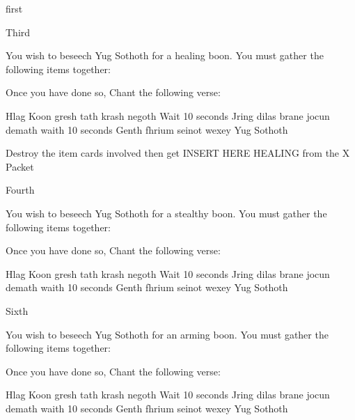 \documentclass[greennotebook]{guildcamp4} %
\begin{document}
\startnotebook{\nRasputinYog{}}

\begin{page}{first}
\end{page}

\begin{page}{Third}
		
		You wish to beseech Yug Sothoth for a healing boon. You must gather the following items together: 
		
		Once you have done so, Chant the following verse:
		
		Hlag Koon gresh tath krash negoth
		Wait 10 seconds
		Jring dilas brane jocun demath
		waith 10 seconds
		Genth fhrium seinot wexey Yug Sothoth
		
		Destroy the item cards involved then get INSERT HERE HEALING from the X Packet 
	\end{page}
	
\begin{page}{Fourth}
	
		You wish to beseech Yug Sothoth for a stealthy boon. You must gather the following items together: 
		
		Once you have done so, Chant the following verse:
		
		Hlag Koon gresh tath krash negoth
		Wait 10 seconds
		Jring dilas brane jocun demath
		waith 10 seconds
		Genth fhrium seinot wexey Yug Sothoth
	
\end{page}

\begin{page}{Sixth}
	
		You wish to beseech Yug Sothoth for an arming boon. You must gather the following items together: 
		
		Once you have done so, Chant the following verse:
		
		Hlag Koon gresh tath krash negoth
		Wait 10 seconds
		Jring dilas brane jocun demath
		waith 10 seconds
		Genth fhrium seinot wexey Yug Sothoth
	
\end{page}
\end{document}
